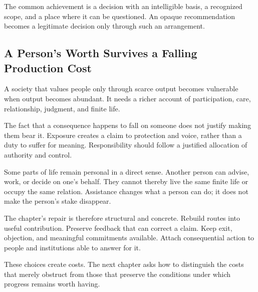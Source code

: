 The common achievement is a decision with an intelligible basis, a recognized scope, and a place where it can be questioned. An opaque recommendation becomes a legitimate decision only through such an arrangement.

\subsection{A Person's Worth Survives a Falling Production Cost}

A society that values people only through scarce output becomes vulnerable when output becomes abundant. It needs a richer account of participation, care, relationship, judgment, and finite life.

The fact that a consequence happens to fall on someone does not justify making them bear it. Exposure creates a claim to protection and voice, rather than a duty to suffer for meaning. Responsibility should follow a justified allocation of authority and control.

Some parts of life remain personal in a direct sense. Another person can advise, work, or decide on one's behalf. They cannot thereby live the same finite life or occupy the same relation. Assistance changes what a person can do; it does not make the person's stake disappear.

The chapter's repair is therefore structural and concrete. Rebuild routes into useful contribution. Preserve feedback that can correct a claim. Keep exit, objection, and meaningful commitments available. Attach consequential action to people and institutions able to answer for it.

These choices create costs. The next chapter asks how to distinguish the costs that merely obstruct from those that preserve the conditions under which progress remains worth having.
